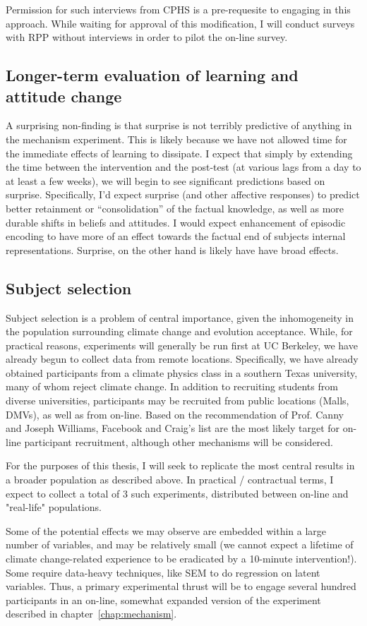 Permission for such interviews from CPHS is a pre-requesite to engaging in this
approach. While waiting for approval of this modification, I will conduct
surveys with RPP without interviews in order to pilot the on-line survey.

\subsection{Longer-term evaluation of learning and attitude change}

A surprising non-finding is that surprise is not terribly predictive of anything
in the mechanism experiment. This is likely because we have not allowed time for
the immediate effects of learning to dissipate. I expect that simply by
extending the time between the intervention and the post-test (at various lags
from a day to at least a few weeks), we will begin to see significant
predictions based on surprise. Specifically, I'd expect surprise (and other
affective responses) to predict better retainment or ``consolidation'' of the
factual knowledge, as well as more durable shifts in beliefs and attitudes. I
would expect enhancement of episodic encoding to have more of an effect towards
the factual end of subjects internal representations. Surprise, on the other
hand is likely have have broad effects.

\subsection{Subject selection}

Subject selection is a problem of central importance, given the inhomogeneity in
the population surrounding climate change and evolution acceptance. While, for
practical reasons, experiments will generally be run first at UC Berkeley, we
have already begun to collect data from remote locations. Specifically, we have
already obtained participants from a climate physics class in a southern Texas
university, many of whom reject climate change. In addition to recruiting
students from diverse universities, participants may be recruited from public
locations (Malls, DMVs), as well as from on-line. Based on the recommendation of
Prof. Canny and Joseph Williams, Facebook and Craig's list are the most likely
target for on-line participant recruitment, although other mechanisms will be
considered.

For the purposes of this thesis, I will seek to replicate the most central
results in a broader population as described above. In practical / contractual
terms, I expect to collect a total of 3 such experiments, distributed between
on-line and "real-life" populations.

Some of the potential effects we may observe are embedded within a large number
of variables, and may be relatively small (we cannot expect a lifetime of
climate change-related experience to be eradicated by a 10-minute
intervention!). Some require data-heavy techniques, like SEM to do regression on
latent variables. Thus, a primary experimental thrust will be to engage several
hundred participants in an on-line, somewhat expanded version of the experiment
described in chapter~\ref{chap:mechanism}.
